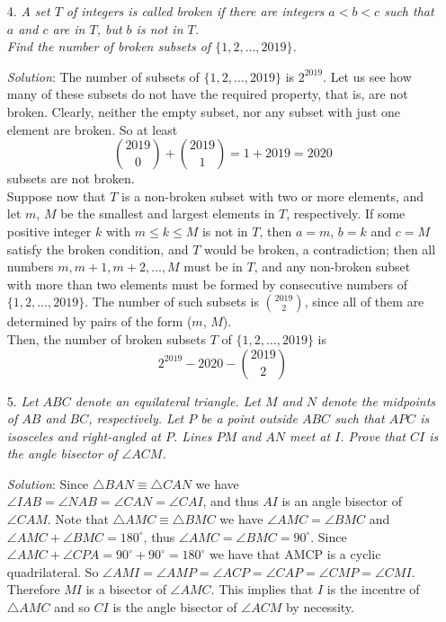 \documentclass{article}
\begin{document}
\begin{enumerate}[1.]
\vspace{6.81mm}

\item[4.] %
\textit{A set $T$ of integers is called \textit{broken} if there are integers $a < b < c$ such that $a$ and $c$ are in $T$, but $b$ is not in $T$.\\
Find the number of broken subsets of $\{1, 2, \dots, 2019\}$.}

\textit{Solution}: 
The number of subsets of $\{1, 2, \dots, 2019\}$ is $2^{2019}$. Let us see how many of these subsets do not have the required property, that is, are not broken.
Clearly, neither the empty subset, nor any subset with just one element are broken. So at least
$$\binom{2019}{0} + \binom{2019}{1} = 1 + 2019 = 2020$$
subsets are not broken.\\
Suppose now that $T$ is a non-broken subset with two or more elements, and let $m$, $M$ be the smallest and largest elements in $T$, respectively. If some positive integer $k$ with $m \le k \le M$ is not in $T$, then $a = m$, $b = k$ and $c = M$ satisfy the broken condition, and $T$ would be broken, a contradiction; then all numbers $m, m + 1, m + 2, \dots, M$ must be in $T$, and any non-broken subset with more than two elements must be formed by consecutive numbers of $\{1, 2, \dots, 2019\}$.
The number of such subsets is $\binom{2019}{2}$, since all of them are determined by pairs of the form ($m$, $M$).\\
Then, the number of broken subsets $T$ of $\{1, 2, \dots, 2019\}$ is
$$2^{2019} - 2020 - \binom{2019}{2}$$

\vspace{6.81mm}

\item[5.] %
\textit{Let $ABC$ denote an equilateral triangle. Let $M$ and $N$ denote the midpoints of $AB$ and $BC$, respectively.
Let $P$ be a point outside $ABC$ such that $APC$ is isosceles and right-angled at $P$. Lines $PM$ and $AN$ meet at $I$.
Prove that $CI$ is the angle bisector of $\angle ACM$.}

\textit{Solution}: 
Since $\triangle BAN \equiv \triangle CAN$ we have $\angle IAB = \angle NAB = \angle CAN = \angle CAI $, and thus $AI$ is an angle bisector of $\angle CAM$. Note that $\triangle AMC \equiv \triangle BMC$ we have $\angle AMC = \angle BMC$ and $\angle AMC + \angle BMC =180^\circ$, thus $\angle AMC = \angle BMC = 90^\circ$. Since $\angle AMC + \angle CPA = 90^\circ +90^\circ =180^\circ$ we have that AMCP is a cyclic quadrilateral. So $\angle AMI = \angle AMP = \angle ACP = \angle CAP = \angle CMP = \angle CMI$. Therefore $MI$ is a bisector of $\angle AMC$. This implies that $I$ is the incentre of $\triangle AMC$ and so $CI$ is the angle bisector of $\angle ACM$ by necessity.


\end{enumerate}
\end{document}
